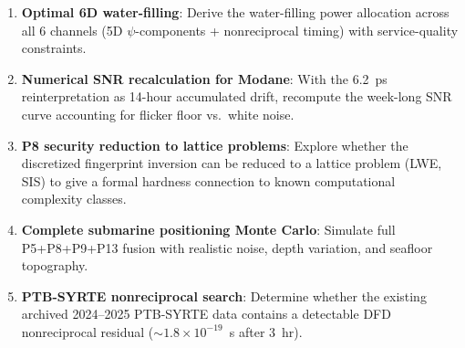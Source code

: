 \documentclass[aps,prd,twocolumn,superscriptaddress,nofootinbib]{revtex4-2}
\begin{document}
\begin{enumerate}
\item \textbf{Optimal 6D water-filling}: Derive the water-filling power
allocation across all 6 channels (5D $\psi$-components + nonreciprocal
timing) with service-quality constraints.

\item \textbf{Numerical SNR recalculation for Modane}: With the 6.2~ps
reinterpretation as 14-hour accumulated drift, recompute the week-long
SNR curve accounting for flicker floor vs.\ white noise.

\item \textbf{P8 security reduction to lattice problems}: Explore whether
the discretized fingerprint inversion can be reduced to a lattice problem
(LWE, SIS) to give a formal hardness connection to known computational
complexity classes.

\item \textbf{Complete submarine positioning Monte Carlo}: Simulate
full P5+P8+P9+P13 fusion with realistic noise, depth variation, and
seafloor topography.

\item \textbf{PTB-SYRTE nonreciprocal search}: Determine whether the
existing archived 2024--2025 PTB-SYRTE data contains a detectable
DFD nonreciprocal residual ($\sim 1.8\times 10^{-19}$~s after 3~hr).
\end{enumerate}
\end{document}

